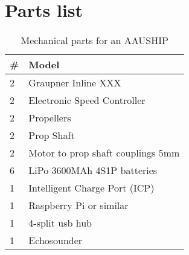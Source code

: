 \section{Parts list}
\begin{table}[htbp]
	\centering
	\begin{tabularx}{\textwidth}{ll}
	\toprule
	\# &  Model \\
	\midrule
	2 & Graupner Inline XXX \\
	2 & Electronic Speed Controller \\
	2 & Propellers \\
	2 & Prop Shaft \\
	2 & Motor to prop shaft couplings 5mm\\
	6 & LiPo 3600MAh 4S1P batteries \\
	1 & Intelligent Charge Port (ICP) \\
	1 & Raspberry Pi or similar \\
	1 & 4-split usb hub\\
	1 & Echosounder \\
	\bottomrule
	\end{tabularx}
	\caption{Mechanical parts for an AAUSHIP}
\end{table}

